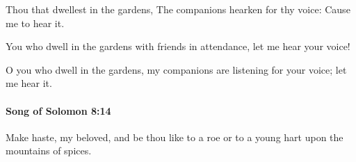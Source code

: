 			\begin{versebox}
					\item[BHS] 
					\item[LXX] 
					\item[ASV] Thou that dwellest in the gardens, The companions hearken for thy voice: Cause me to hear it.
					\item[NIV] You who dwell in the gardens with friends in attendance, let me hear your voice!
					\item[NRSV] O you who dwell in the gardens, my companions are listening for your voice; let me hear it.
			\end{versebox}

		\paragraph{Song of Solomon 8:14} %
			\label{SONGOFSOLOMON-8-14}

			Make haste, my beloved, and be thou like to a roe or to a young hart upon the mountains of spices.

